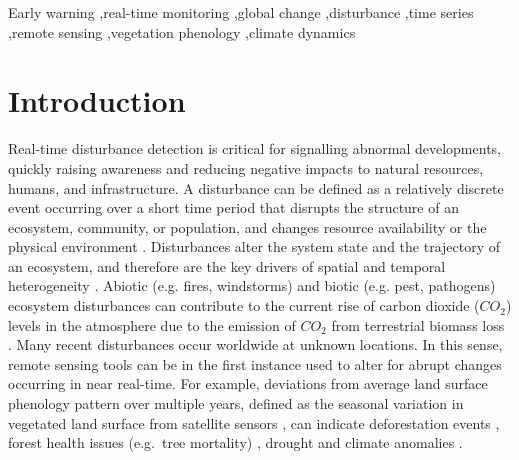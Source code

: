 \documentclass[authoryear,preprint,review,10pt]{elsarticle}
\begin{document}
\begin{frontmatter}
\begin{keyword}
Early warning \sep real-time monitoring \sep global change \sep disturbance \sep time series \sep remote sensing \sep vegetation phenology \sep climate dynamics
\end{keyword}

\end{frontmatter}



\section{Introduction}


Real-time disturbance detection is critical for signalling abnormal developments, quickly raising awareness and reducing negative impacts to natural resources, humans, and infrastructure. A disturbance can be defined as a relatively discrete event occurring over a short time period that disrupts the structure of an ecosystem, community, or population, and changes resource availability or the physical environment \citep{Pickett:1986td}. Disturbances alter the system state and the trajectory of an ecosystem, and therefore are the key drivers of spatial and temporal heterogeneity \citep{Turner:2010wo}. Abiotic (e.g. fires, windstorms) and biotic (e.g. pest, pathogens) ecosystem disturbances can contribute to the current rise of carbon dioxide ($CO_2$) levels in the atmosphere due to the emission of $CO_2$ from terrestrial biomass loss \citep{Potter2003,Schimel:2001vi}. 
Many recent disturbances occur worldwide at unknown locations. In this sense, remote sensing tools can be in the first instance used to alter for abrupt changes occurring in near real-time. For example, deviations from average land surface phenology pattern over multiple years, defined as the seasonal variation in vegetated land surface from satellite sensors \citep{White2009}, can indicate deforestation events \citep{Asner:2011fa}, forest health issues (e.g.\ tree mortality) \citep{Hargrove2009, Stone2008, Verbesselt2009}, drought and climate anomalies \citep{Funk:2009vf,Vrieling:2011da}.
\end{document}
